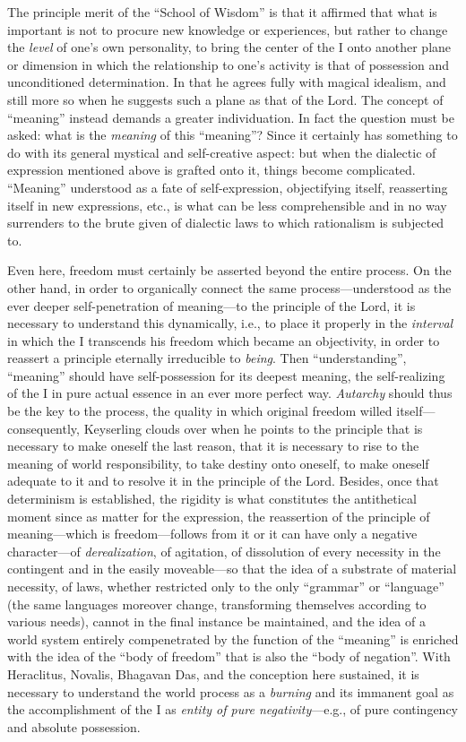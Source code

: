 The principle merit of the ``School of Wisdom'' is that it affirmed that what is important is not to procure new knowledge or experiences, but rather to change the \emph{level} of one's own personality, to bring the center of the I onto another plane or dimension in which the relationship to one's activity is that of possession and unconditioned determination. In that he agrees fully with magical idealism, and still more so when he suggests such a plane as that of the Lord. The concept of ``meaning'' instead demands a greater individuation. In fact the question must be asked: what is the \emph{meaning} of this ``meaning''? Since it certainly has something to do with its general mystical and self-creative aspect: but when the dialectic of expression mentioned above is grafted onto it, things become complicated. ``Meaning'' understood as a fate of self-expression, objectifying itself, reasserting itself in new expressions, etc., is what can be less comprehensible and in no way surrenders to the brute given of dialectic laws to which rationalism is subjected to.

Even here, freedom must certainly be asserted beyond the entire process. On the other hand, in order to organically connect the same process---understood as the ever deeper self-penetration of meaning---to the principle of the Lord, it is necessary to understand this dynamically, i.e., to place it properly in the \emph{interval} in which the I transcends his freedom which became an objectivity, in order to reassert a principle eternally irreducible to \emph{being}. Then ``understanding'', ``meaning'' should have self-possession for its deepest meaning, the self-realizing of the I in pure actual essence in an ever more perfect way. \emph{Autarchy} should thus be the key to the process, the quality in which original freedom willed itself---consequently, Keyserling clouds over when he points to the principle that is necessary to make oneself the last reason, that it is necessary to rise to the meaning of world responsibility, to take destiny onto oneself, to make oneself adequate to it and to resolve it in the principle of the Lord. Besides, once that determinism is established, the rigidity is what constitutes the antithetical moment since as matter for the expression, the reassertion of the principle of meaning---which is freedom---follows from it or it can have only a negative character---of \emph{derealization}, of agitation, of dissolution of every necessity in the contingent and in the easily moveable---so that the idea of a substrate of material necessity, of laws, whether restricted only to the only ``grammar'' or ``language'' (the same languages moreover change, transforming themselves according to various needs), cannot in the final instance be maintained, and the idea of a world system entirely compenetrated by the function of the ``meaning'' is enriched with the idea of the ``body of freedom'' that is also the ``body of negation''. With Heraclitus, Novalis, Bhagavan Das, and the conception here sustained, it is necessary to understand the world process as a \emph{burning} and its immanent goal as the accomplishment of the I as \emph{entity of pure negativity}---e.g., of pure contingency and absolute possession.

